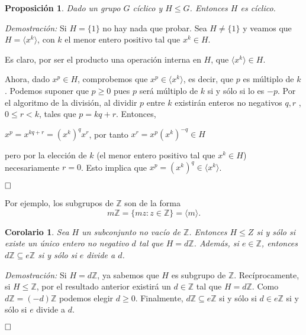 \documentclass[12pt]{article}
\newtheorem{proposition}[theorem]{Proposición}
\newtheorem{corolario}{Corolario}[theorem]
\begin{document}
\begin{proposition}\label{eq:subciclico} Dado un grupo $G$ cíclico y $H \leq G$. Entonces $H$ es cíclico.
\end{proposition}
\emph{Demostración: } Si $H = \lbrace 1 \rbrace$ no hay nada que probar. Sea $H \neq \lbrace 1 \rbrace$ y veamos que $H = \langle x^{k} \rangle$, con $k$ el menor entero positivo tal que $x^{k} \in H$.

Es claro, por ser el producto una operación interna en $H$, que $\langle x^{k} \rangle \in H$.

Ahora, dado $x ^{p} \in H$, comprobemos que $x^{p} \in \langle x^{k} \rangle$, es decir, que $p$ es múltiplo de $k$. Podemos suponer que $p \geq 0$ pues $p$ será múltiplo de $k$ si y sólo si lo es $-p$. Por el algoritmo de la división, al dividir $p$ entre $k$ existirán enteros no negativos $q,r$ , $0 \leq r < k$, tales que $p = kq + r$. Entonces, 
\begin{center}
$x^{p} = x^{kq+r} = (x^{k})^{q}x^{r}$, por tanto $x^{r} = x^{p}(x^{k})^{-q} \in H$
\end{center}
pero por la elección de $k$ (el menor entero positivo tal que $x^{k} \in H$) necesariamente $r = 0$. Esto implica que $x^{p} = (x^{k})^{q} \in \langle x^{k} \rangle$.

$\hfill \square$

Por ejemplo, los subgrupos de $\mathbb{Z}$ son de la forma $$m\mathbb{Z} = \lbrace mz : z \in \mathbb{Z} \rbrace = \langle m \rangle.$$

\begin{corolario}Sea $H$ un subconjunto no vacío de $\mathbb{Z}$. Entonces $H \leq Z$ si y sólo si existe un único entero no negativo $d$ tal que $H = d\mathbb{Z}$. Además, si $e \in \mathbb{Z}$, entonces $d\mathbb{Z} \subseteq e\mathbb{Z}$ si y sólo si $e$ divide a $d$.
\end{corolario}
\emph{Demostración: }Si $H = d\mathbb{Z}$, ya sabemos que $H$ es subgrupo de $\mathbb{Z}$. Recíprocamente, si $H \leq \mathbb{Z}$, por el resultado anterior existirá un $d \in \mathbb{Z}$ tal que $H = d\mathbb{Z}$. Como $d\mathbb{Z} = (-d)\mathbb{Z}$ podemos elegir $d \geq 0$. Finalmente, $d\mathbb{Z} \subseteq e\mathbb{Z}$ si y sólo si $d \in e\mathbb{Z}$ si y sólo si $e$ divide a $d$.

$\hfill \square$
\end{document}
